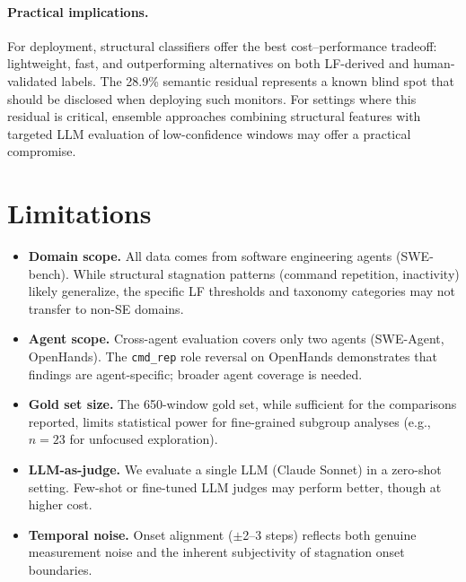 \documentclass[11pt]{article}
\begin{document}
\paragraph{Practical implications.}
For deployment, structural classifiers offer the best cost--performance tradeoff: lightweight, fast, and outperforming alternatives on both LF-derived and human-validated labels. The 28.9\% semantic residual represents a known blind spot that should be disclosed when deploying such monitors. For settings where this residual is critical, ensemble approaches combining structural features with targeted LLM evaluation of low-confidence windows may offer a practical compromise.

\section{Limitations}
\label{sec:limitations}

\begin{itemize}[leftmargin=*,itemsep=1pt]
\item \textbf{Domain scope.} All data comes from software engineering agents (SWE-bench). While structural stagnation patterns (command repetition, inactivity) likely generalize, the specific LF thresholds and taxonomy categories may not transfer to non-SE domains.
\item \textbf{Agent scope.} Cross-agent evaluation covers only two agents (SWE-Agent, OpenHands). The \texttt{cmd\_rep} role reversal on OpenHands demonstrates that findings are agent-specific; broader agent coverage is needed.
\item \textbf{Gold set size.} The 650-window gold set, while sufficient for the comparisons reported, limits statistical power for fine-grained subgroup analyses (e.g., $n\!=\!23$ for unfocused exploration).
\item \textbf{LLM-as-judge.} We evaluate a single LLM (Claude Sonnet) in a zero-shot setting. Few-shot or fine-tuned LLM judges may perform better, though at higher cost.
\item \textbf{Temporal noise.} Onset alignment ($\pm$2--3 steps) reflects both genuine measurement noise and the inherent subjectivity of stagnation onset boundaries.
\end{itemize}

\end{document}
